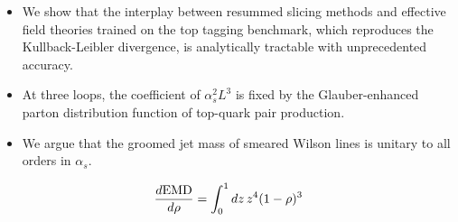 \begin{itemize}
  \item We show that the interplay between resummed slicing methods and effective field theories trained on the top tagging benchmark, which reproduces the Kullback-Leibler divergence, is analytically tractable with unprecedented accuracy.
  \item At three loops, the coefficient of $\alpha_s^2 L^3$ is fixed by the Glauber-enhanced parton distribution function of top-quark pair production.
  \item We argue that the groomed jet mass of smeared Wilson lines is unitary to all orders in $\alpha_s$.
\end{itemize}

\begin{equation}
  \frac{d \mathrm{EMD}}{d \rho} = \int_0^1 dz \, {z}^{4} (1 - \rho)^{3}
  \label{eq:4}
\end{equation}

